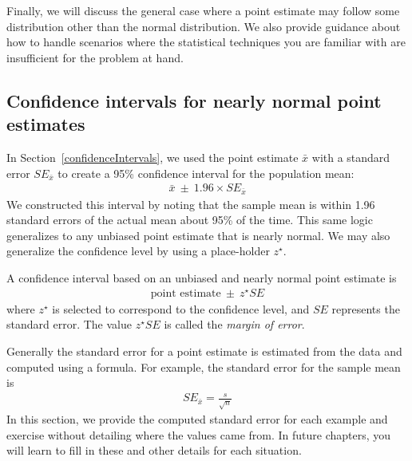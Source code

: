 Finally, we will discuss the general case where a point estimate may follow some distribution other than the normal distribution. We also provide guidance about how to handle scenarios where the statistical techniques you are familiar with are insufficient for the problem at hand.


\subsection{Confidence intervals for nearly normal point estimates}


In Section~\ref{confidenceIntervals}, we used the point estimate $\bar{x}$ with a standard error $SE_{\bar{x}}$ to create a 95\% confidence interval for the population mean:
\begin{align}
\bar{x}\ \pm\ 1.96 \times SE_{\bar{x}}
\label{95PercCIForMeanInGeneralizingSection}
\end{align}
We constructed this interval by noting that the sample mean is within 1.96 standard errors of the actual mean about 95\% of the time. This same logic generalizes to any unbiased point estimate that is nearly normal. We may also generalize the confidence level by using a place-holder $z^{\star}$.

\begin{termBox}{\label{generalConfidenceIntervalTermBox}%
A confidence interval based on an unbiased and nearly normal point estimate is
\begin{eqnarray}
\text{point estimate}\ \pm\ z^{\star}SE
\label{95PercGeneralCIInGeneralizingSection}
\end{eqnarray}
where $z^{\star}$ is selected to correspond to the confidence level, and $SE$ represents the standard error. The value $z^{\star}SE$ is called the \emph{margin of error}.}
\end{termBox}

Generally the standard error for a point estimate is estimated from the data and computed using a formula. For example, the standard error for the sample mean is
\begin{eqnarray*}
SE_{\bar{x}} = \frac{s}{\sqrt{n}}
\end{eqnarray*}
In this section, we provide the computed standard error for each example and exercise without detailing where the values came from. In future chapters, you will learn to fill in these and other details for each situation.

